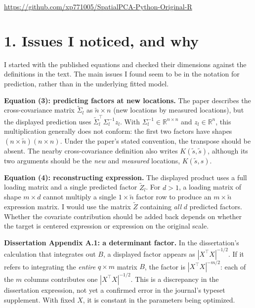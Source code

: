 \documentclass[11pt,letterpaper]{article}
\newcommand{\R}{\mathbb R}
\begin{document}
\begin{center}
\url{https://github.com/xp771005/SpatialPCA-Python-Original-R}
\end{center}
\vspace{-0.45em}

\section*{1. Issues I noticed, and why}

I started with the published equations and checked their dimensions against the definitions in the text. The main issues I found seem to be in the notation for prediction, rather than in the underlying fitted model.

\textbf{Equation (3): predicting factors at new locations.} The paper describes the cross-covariance matrix $\widetilde\Sigma_l$ as $\widetilde n\times n$ (new locations by measured locations), but the displayed prediction uses $\widetilde\Sigma_l^{\top}\Sigma_l^{-1}z_l$. With $\Sigma_l^{-1}\in\R^{n\times n}$ and $z_l\in\R^n$, this multiplication generally does not conform: the first two factors have shapes $(n\times\widetilde n)(n\times n)$. Under the paper's stated convention, the transpose should be absent. The nearby cross-covariance definition also writes $K(\widetilde s,\widetilde s)$, although its two arguments should be the \emph{new} and \emph{measured} locations, $K(\widetilde s,s)$.

\textbf{Equation (4): reconstructing expression.} The displayed product uses a full loading matrix and a single predicted factor $\widetilde Z_l$. For $d>1$, a loading matrix of shape $m\times d$ cannot multiply a single $1\times\widetilde n$ factor row to produce an $m\times\widetilde n$ expression matrix. I would use the matrix $\widetilde Z$ containing \emph{all} $d$ predicted factors. Whether the covariate contribution should be added back depends on whether the target is centered expression or expression on the original scale.

\textbf{Dissertation Appendix A.1: a determinant factor.} In the dissertation's calculation that integrates out $B$, a displayed factor appears as $|X^{\top}X|^{-1/2}$. If it refers to integrating the \emph{entire} $q\times m$ matrix $B$, the factor is $|X^{\top}X|^{-m/2}$: each of the $m$ columns contributes one $|X^{\top}X|^{-1/2}$. This is a discrepancy in the dissertation expression, not yet a confirmed error in the journal's typeset supplement. With fixed $X$, it is constant in the parameters being optimized.
\end{document}

